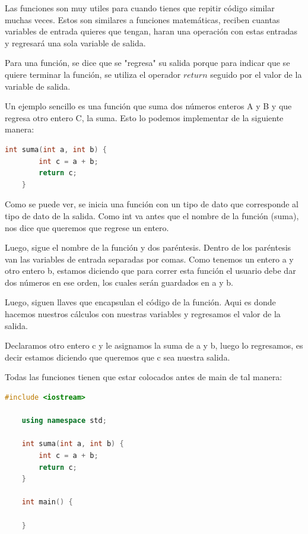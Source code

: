 \documentclass{article}
\begin{document}
Las funciones son muy utiles para cuando tienes que repitir código similar muchas veces. Estos son similares a funciones matemáticas, reciben cuantas variables de entrada quieres que tengan, haran una operación con estas entradas y regresará una sola variable de salida.

Para una función, se dice que se "regresa" su salida porque para indicar que se quiere terminar la función, se utiliza el operador $return$ seguido por el valor de la variable de salida.

Un ejemplo sencillo es una función que suma dos números enteros A y B y que regresa otro entero C, la suma. Esto lo podemos implementar de la siguiente manera:

\begin{lstlisting}[language=C++, caption=Función de suma]
    int suma(int a, int b) {
        int c = a + b;
        return c;
    }
\end{lstlisting}

Como se puede ver, se inicia una función con un tipo de dato que corresponde al tipo de dato de la salida. Como int va antes que el nombre de la función (suma), nos dice que queremos que regrese un entero.

Luego, sigue el nombre de la función y dos paréntesis. Dentro de los paréntesis van las variables de entrada separadas por comas. Como tenemos un entero a y otro entero b, estamos diciendo que para correr esta función el usuario debe dar dos números en ese orden, los cuales serán guardados en a y b.

Luego, siguen llaves que encapsulan el código de la función. Aqui es donde hacemos nuestros cálculos con nuestras variables y regresamos el valor de la salida.

Declaramos otro entero c y le asignamos la suma de a y b, luego lo regresamos, es decir estamos diciendo que queremos que c sea nuestra salida.

Todas las funciones tienen que estar colocados antes de main de tal manera:

\begin{lstlisting}[language=C++, caption=Función de suma]
    #include <iostream>

    using namespace std;
    
    int suma(int a, int b) {
        int c = a + b;
        return c;
    }

    int main() {

    }
\end{lstlisting}
\end{document}
